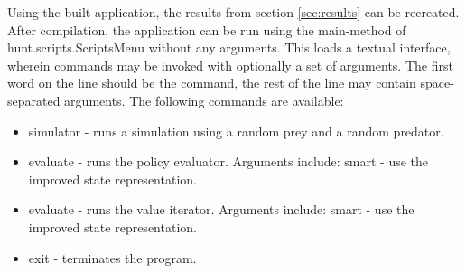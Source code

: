 Using the built application, the results from section \ref{sec:results} can be recreated. After compilation, the application can be run using the main-method of hunt.scripts.ScriptsMenu without any arguments. This loads a textual interface, wherein commands may be invoked with optionally a set of arguments. The first word on the line should be the command, the rest of the line may contain space-separated arguments. The following commands are available:

\begin{itemize}
  \item simulator - runs a simulation using a random prey and a random predator.
  \item evaluate - runs the policy evaluator. Arguments include:
    \subitem smart - use the improved state representation.
  \item evaluate - runs the value iterator. Arguments include:
    \subitem smart - use the improved state representation.
  \item exit - terminates the program.
\end{itemize}